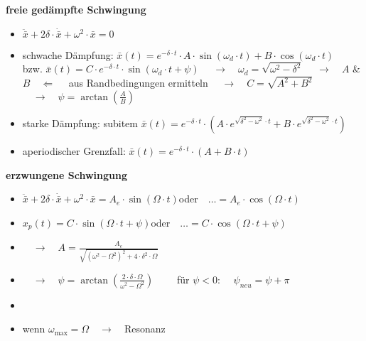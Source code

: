 \documentclass[10pt,a4paper,landscape, hidelinks]{article}
\newcommand*\variant[1]{\bar{#1}}
\begin{document}
\begin{multicols*}{3}
\vspace{20pt}

\textbf{freie gedämpfte Schwingung}
\begin{itemize}[leftmargin=*]
        \item [] $\ddot{\variant{x}}+2\delta\cdot\dot{\variant{x}}+\omega^2\cdot\variant{x}=0$
        \item [] schwache Dämpfung: 
        \subitem $\variant{x}(t)=e^{-\delta\cdot t}\cdot A\cdot\sin(\omega_d\cdot t)+B\cdot\cos(\omega_d\cdot t)\qquad$
        \subitem \tabto{1.8cm}bzw.
        \subitem $\variant{x}(t)=C\cdot e^{-\delta\cdot t}\cdot\sin(\omega_d\cdot t+\psi)$
        \subitem $\quad\longrightarrow\quad\omega_d=\sqrt{\omega^2-\delta^2}$
        \subitem $\quad\longrightarrow\quad A$ \& $B\quad\Leftarrow\quad$ aus Randbedingungen ermitteln
        \subitem $\quad\longrightarrow\quad C=\sqrt{A^2+B^2}$
        \subitem $\quad\longrightarrow\quad\psi=\arctan\left(\frac{A}{B}\right)$
        \item [] starke Dämpfung: 
        \subitem subitem $\variant{x}(t)=e^{-\delta\cdot t}\cdot\left(A\cdot e^{\sqrt{\delta^2-\omega^2}\cdot t}+B\cdot e^{\sqrt{\delta^2-\omega^2}\cdot t}\right)$
        \item [] aperiodischer Grenzfall: 
        \subitem $\variant{x}(t)=e^{-\delta\cdot t}\cdot(A+B\cdot t)$
\end{itemize}

\par\vspace{150pt}\null
\columnbreak

\textbf{erzwungene Schwingung}
\begin{itemize}[leftmargin=*]
        \item [] $\ddot{\variant{x}}+2\delta\cdot\dot{\variant{x}}+\omega^2\cdot\variant{x}=A_e\cdot\sin(\Omega\cdot t)$\tabto{5.1cm}oder$\quad\dots=A_e\cdot\cos(\Omega\cdot t)$
        \item [] $x_p(t)=C\cdot\sin(\Omega\cdot t+\psi)$\tabto{5.1cm}oder$\quad\dots=C\cdot\cos(\Omega\cdot t+\psi)$
        \item [] $\quad\longrightarrow\quad A=\frac{A_e}{\sqrt{(\omega^2-\Omega^2)^2+4\cdot\delta^2\cdot\Omega}}$
        \item [] $\quad\longrightarrow\quad\psi=\arctan(\frac{2\cdot\delta\cdot\Omega}{\omega^2-\Omega^2})\qquad$ für $\psi<0$: $\quad\psi_{neu}=\psi+\pi$
        \item [] 
        \item [] {\scriptsize wenn $\omega_\text{max}=\Omega\quad\rightarrow\quad$Resonanz}
\end{itemize}


\end{multicols*}
\end{document}
